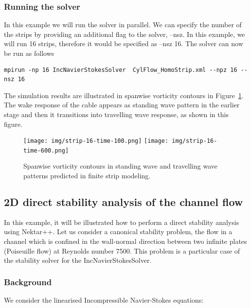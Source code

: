 \subsubsection{Running the solver}
In this example we will run the solver in parallel. We can specify the number of the strips by providing an additional flag to the solver, –nsz. In this example, we will run 16 strips, therefore it would be specified as –nsz 16. The solver can now be run as follows    

\begin{lstlisting}[style=BashInputStyle]
mpirun -np 16 IncNavierStokesSolver  CylFlow_HomoStrip.xml --npz 16 --nsz 16
\end{lstlisting}

The simulation results are illustrated in spanwise vorticity contours in Figure~\ref{f:incns:finite-strip-modeling}. The wake response of the cable appears as standing wave pattern in the earlier stage and then it transitions into travelling wave response, as shown in this figure.  

\begin{figure}
\begin{center}
\texttt{[image: img/strip-16-time-100.png]}
\texttt{[image: img/strip-16-time-600.png]}
\caption{Spanwise vorticity contours in standing wave and travelling wave patterns predicted in finite strip modeling.}
\label{f:incns:finite-strip-modeling}
\end{center}
\end{figure}

 \subsection{2D direct stability analysis of the channel flow}

  In this example, it will be illustrated how to perform a direct stability analysis using Nektar++. Let us consider a canonical stability problem, the flow in a channel which is confined in the wall-normal direction between two infinite plates (Poiseuille flow) at Reynolds number 7500. This problem is a particular case of the stability solver for the IncNavierStokesSolver.

 \subsubsection{Background}

  We consider the linearised Incompressible Navier-Stokes equations:

